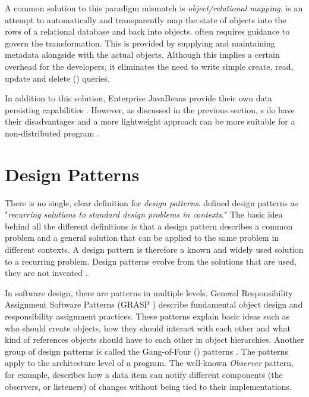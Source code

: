 A common solution to this paradigm mismatch is 
\textsl{object/relational mapping}.  is an attempt to 
automatically and transparently map the state of objects into the rows 
of a relational database and back into objects.  often 
requires guidance to govern the transformation. This is provided by 
supplying and maintaining metadata alongside with the actual objects. 
Although this implies a certain overhead for the developers, it 
eliminates the need to write simple create, read, update and delete 
() queries. \citep{hibernateaction}

In addition to this solution, Enterprise JavaBeans provide their own 
data persisting capabilities \citep{ejb}. However, as discussed in the 
previous section, s do have their disadvantages and a more 
lightweight approach can be more suitable for a non-distributed 
program \citep{j2eednd}.



\section{Design Patterns}
\label{toc:webdevel:patterns}

There is no single, clear definition for \textsl{design patterns}. 
\cite{patternj2ee} defined design patterns as "\textsl{recurring 
solutions to standard design problems in contexts}." The basic idea 
behind all the different definitions is that a design pattern 
describes a common problem and a general solution that can be applied 
to the same problem in different contexts. A design pattern is 
therefore a known and widely used solution to a recurring problem. 
Design patterns evolve from the solutions that are used, they are not 
invented \citep{applying}.

In software design, there are patterns in multiple levels. General 
Responsibility Assignment Software Patterns (GRASP \citep{applying}) 
describe fundamental object design and responsibility assignment 
practices. These patterns explain basic ideas such as who should 
create objects, how they should interact with each other and what kind 
of references objects should have to each other in object hierarchies. 
Another group of design patterns is called the Gang-of-Four 
() patterns \citep{applying}. The  patterns 
apply to the architecture level of a program. The well-known 
\textsl{Observer} pattern, for example, describes how a data item can 
notify different components (the observers, or listeners) of changes 
without being tied to their implementations.

